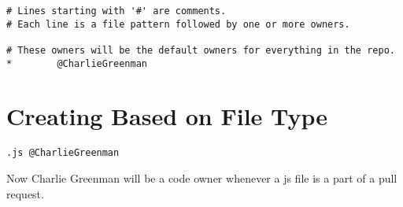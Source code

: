 \begin{lstlisting}
# Lines starting with '#' are comments.
# Each line is a file pattern followed by one or more owners.

# These owners will be the default owners for everything in the repo.
*        @CharlieGreenman

\end{lstlisting}

\section{ Creating \codeowners{} Based on File Type }
\begin{lstlisting}
.js @CharlieGreenman
\end{lstlisting}

Now Charlie Greenman will be a code owner whenever a js file is a part of a
pull request.

